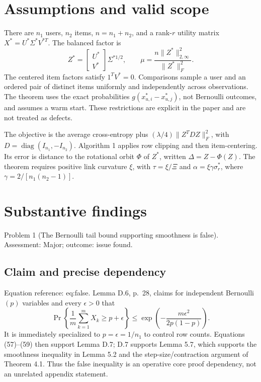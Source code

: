 \documentclass[10pt]{article}
\begin{document}
\section*{Assumptions and valid scope}
There are \(n_1\) users, \(n_2\) items, \(n=n_1+n_2\), and a rank-\(r\) utility matrix \(X^*=U^*\Sigma^*V^{*T}\). The balanced factor is \[Z^*=\begin{bmatrix}U^*\\V^*\end{bmatrix}\Sigma^{*1/2},
 \qquad
 \mu=\frac{n\|Z^*\|_{2,\infty}^2}{\|Z^*\|_F^2}.\] The centered item factors satisfy \(1^TV^*=0\). Comparisons sample a user and an ordered pair of distinct items uniformly and independently across observations. The theorem uses the exact probabilities \(g(x^*_{u,i}-x^*_{u,j})\), not Bernoulli outcomes, and assumes a warm start. These restrictions are explicit in the paper and are not treated as defects.\par
The objective is the average cross-entropy plus \((\lambda/4)\|Z^TDZ\|_F^2\), with \(D=\operatorname{diag}(I_{n_1},-I_{n_2})\). Algorithm 1 applies row clipping and then item-centering. Its error is distance to the rotational orbit \(\Phi\) of \(Z^*\), written \(\Delta=Z-\Phi(Z)\). The theorem requires positive link curvature \(\xi\), with \(\tau=\xi/\Xi\) and \(\alpha=\xi\gamma\sigma_r^*\), where \(\gamma=2/[n_1(n_2-1)]\).\par
\section*{Substantive findings}
Problem 1 (The Bernoulli tail bound supporting smoothness is false).  Assessment: Major; outcome: issue found.\par
\subsection*{Claim and precise dependency}
Equation reference: eq:false. Lemma D.6, p. 28, claims for independent Bernoulli\((p)\) variables and every \(\epsilon>0\) that \[
 \Pr\left\{\frac1m\sum_{k=1}^m X_k\ge p+\epsilon\right\}
 \le \exp\left(-\frac{m\epsilon^2}{2p(1-p)}\right).\] It is immediately specialized to \(p=\epsilon=1/n_1\) to control row counts. Equations (57)–(59) then support Lemma D.7; D.7 supports Lemma 5.7, which supports the smoothness inequality in Lemma 5.2 and the step-size/contraction argument of Theorem 4.1. Thus the false inequality is an operative core proof dependency, not an unrelated appendix statement.\par
\end{document}

